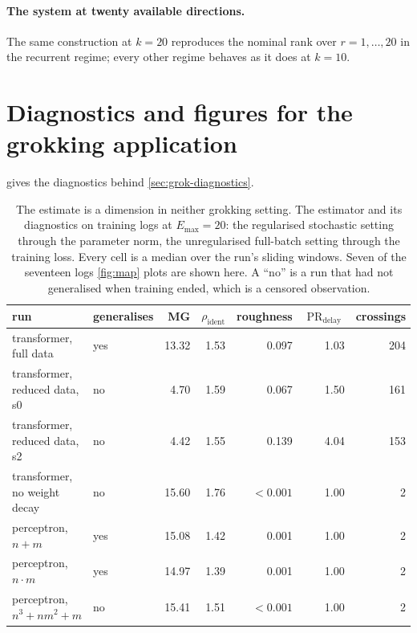 \documentclass{article}
\DeclareMathOperator{\PR}{PR}
\begin{document}
\paragraph{The system at twenty available directions.} The same construction at $k = 20$
reproduces the nominal rank over $r = 1, \dots, 20$ in the recurrent regime; every other regime
behaves as it does at $k = 10$.

\section{Diagnostics and figures for the grokking application}\label{app:pairs}

 gives the diagnostics behind \cref{sec:grok-diagnostics}.

\begin{table}[H]
\centering
\caption{The estimate is a dimension in neither grokking setting. The estimator
and its diagnostics on
training logs at $E_{\max} = 20$: the regularised stochastic setting through the parameter norm, the unregularised full-batch setting through the
training loss. Every cell is a median over the run's sliding windows. Seven of the seventeen logs
\cref{fig:map} plots are shown here. A ``no'' is a run that had not
generalised when training ended, which is a censored observation.}
\label{tab:grok-diagnostics}
\setlength{\tabcolsep}{4.2pt}
\begin{tabular}{llrrrrr}
\toprule
run & generalises & MG & $\rho_{\mathrm{ident}}$ & roughness & $\PR_{\mathrm{delay}}$ & crossings \\
\midrule
transformer, full data           & yes & 13.32 & 1.53 & 0.097 & 1.03 & 204 \\
transformer, reduced data, s0    & no  & 4.70  & 1.59 & 0.067 & 1.50 & 161 \\
transformer, reduced data, s2    & no  & 4.42  & 1.55 & 0.139 & 4.04 & 153 \\
transformer, no weight decay     & no  & 15.60 & 1.76 & $<0.001$ & 1.00 & 2 \\
\midrule
perceptron, $n+m$                & yes & 15.08 & 1.42 & 0.001 & 1.00 & 2 \\
perceptron, $n \cdot m$          & yes & 14.97 & 1.39 & 0.001 & 1.00 & 2 \\
perceptron, $n^3+nm^2+m$         & no  & 15.41 & 1.51 & $<0.001$ & 1.00 & 2 \\
\bottomrule
\end{tabular}
\end{table}
\end{document}
